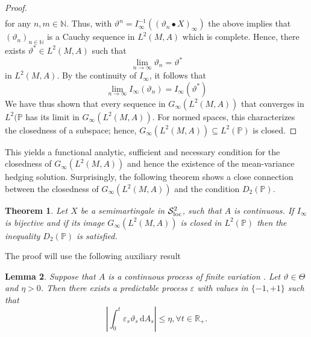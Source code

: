 \documentclass[11pt,a4paper,twoside,openany]{report}
\numberwithin{equation}{section}
\newcommand{\diff}{\mathrm{d}}
\theoremstyle{plain} %
\newtheorem{theorem}{Theorem}[section]
\newtheorem{lemma}[theorem]{Lemma}
\theoremstyle{definition} %
\theoremstyle{remark} %
\begin{document}
\begin{proof}
\begin{align*}
   \end{align*}
   for any \(n,m\in\mathbb{N}\).
   Thus, with \(\vartheta^n=I_{\infty}^{-1}((\vartheta_n\bullet X)_{\infty})\) the above implies that  \((\vartheta_n)_{n\in\mathbb{N}}\) is a Cauchy sequence in \(L^2(M,A)\) which is complete. Hence, there exists \(\vartheta^*\in L^2(M,A)\) such that 
   \begin{equation*}
       \lim_{n\to\infty}\vartheta_n=\vartheta^*
   \end{equation*}
   in \(L^2(M,A)\).
 By the continuity of \(I_{\infty}\), it follows that 
   \begin{equation*}
       \lim_{n\to\infty}I_{\infty}(\vartheta
       _n)=I_{\infty}(\vartheta^*)
   \end{equation*}
   We have thus shown that every sequence in \(G_{\infty}(L^2(M,A))\) that converges in \(L^2(\mathbb{P}\) has its limit in \(G_{\infty}(L^2(M,A))\). For normed spaces, this characterizes the closedness of a subspace; hence, \(G_{\infty}(L^2(M,A))\subseteq L^2(\mathbb{P})\) is closed. 
\end{proof}
This yields a functional analytic, sufficient and necessary condition for the closedness of \(G_{\infty}(L^2(M,A))\) and hence the existence of the mean-variance hedging solution. Surprisingly, the following theorem shows a close connection between the closedness of \(G_{\infty}(L^2(M,A))\) and the condition \(D_2(\mathbb{P})\). 
\begin{theorem}\label{thm:G_T closed implies D_2(P)}
    Let \(X\) be a semimartingale in \(\mathcal{S}^2_{\rm{loc}}\), such that \(A\) is continuous.  If \(I_{\infty}\) is bijective and if its image \(G_{\infty}(L^2(M,A))\) is closed in \(L^2(\mathbb{P})\) then the inequality \(D_2(\mathbb{P})\) is satisfied. 
\end{theorem}
The proof will use the following auxiliary result

\begin{lemma}\label{lemma:predictable epsilon}
Suppose that $A$ is a continuous process of finite variation . Let $\vartheta \in \Theta$ and $\eta>0$. Then there exists a predictable process $\varepsilon$ with values in $\{-1,+1\}$ such that
\begin{equation*}
     |\int_0^t \varepsilon_s\vartheta_s\,\diff A_s|\le \eta,\forall t\in\mathbb{R}_+.
\end{equation*}
\end{lemma}
\end{document}
